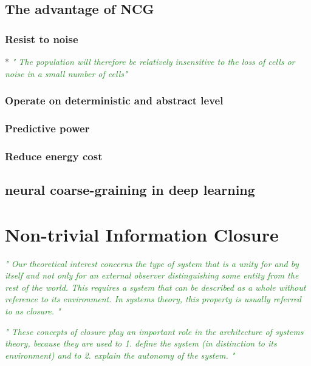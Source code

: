 \documentclass[utf8]{article}
\makeatletter
\newcommand{\rewrite}[1]{\textcolor{ForestGreen}{\textit{"#1"}}\newline}
\newcommand{\martin}[1]{\todo[color=SpringGreen]{@Martin:\\#1}}
\makeatother
\begin{document}
		\subsection{The advantage of NCG}
			\subsubsection{Resist to noise}
				* \rewrite{ The population will therefore be relatively insensitive to the loss of
					cells or noise in a small number of cells} \cite{eurich2000multidimensional}
		
		
			\subsubsection{Operate on deterministic and abstract level}
			\subsubsection{Predictive power}
			\subsubsection{Reduce energy cost}	
			
		\subsection{neural coarse-graining in deep learning}
			\martin{todo}
			
			
	\section{Non-trivial Information Closure} 
		\martin{todo}

		\rewrite{
			Our theoretical interest concerns the type of system that is a unity for and by itself and not only for an external observer distinguishing some entity from the rest of the world. This requires a system that can be described as a whole without reference to its environment. In systems theory, this property is usually referred to as closure.
		}\citep{BERTSCHINGER.2006}
		
		
		\rewrite{
			These concepts of closure play an important role in the architecture of systems
			theory, because they are used to
			1. define the system (in distinction to its environment) and to 
			2. explain the autonomy of the system.
		}
		
\end{document}
